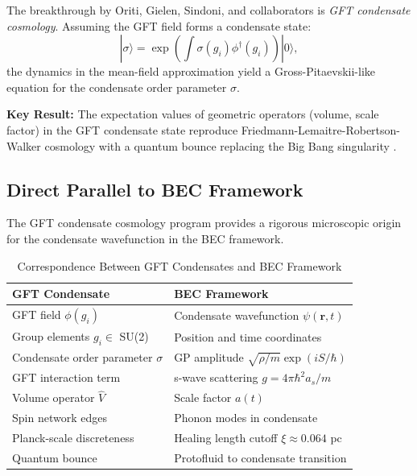 \documentclass[11pt,a4paper]{article}
\theoremstyle{definition}
\theoremstyle{remark}
\begin{document}
The breakthrough by Oriti, Gielen, Sindoni, and collaborators \cite{Gielen2013,Oriti2016,Gielen2016} is \emph{GFT condensate cosmology}. Assuming the GFT field forms a condensate state:
\begin{equation}
\label{eq:gft_condensate}
|\sigma\rangle = \exp\left(\int \sigma(g_i) \phi^\dagger(g_i)\right) |0\rangle,
\end{equation}
the dynamics in the mean-field approximation yield a Gross-Pitaevskii-like equation for the condensate order parameter $\sigma$.

\textbf{Key Result:} The expectation values of geometric operators (volume, scale factor) in the GFT condensate state reproduce Friedmann-Lemaitre-Robertson-Walker cosmology with a quantum bounce replacing the Big Bang singularity \cite{Oriti2016}.

\subsection{Direct Parallel to BEC Framework}
\label{sec:gft_bec_parallel}

The GFT condensate cosmology program provides a rigorous microscopic origin for the condensate wavefunction in the BEC framework.

\begin{table}[H]
\centering
\caption{Correspondence Between GFT Condensates and BEC Framework}
\label{tab:gft_bec}
\begin{tabular}{@{}ll@{}}
\toprule
\textbf{GFT Condensate} & \textbf{BEC Framework} \\
\midrule
GFT field $\phi(g_i)$ & Condensate wavefunction $\psi(\mathbf{r},t)$ \\
Group elements $g_i \in$ SU(2) & Position and time coordinates \\
Condensate order parameter $\sigma$ & GP amplitude $\sqrt{\rho/m}\exp(iS/\hbar)$ \\
GFT interaction term & s-wave scattering $g = 4\pi\hbar^2 a_s/m$ \\
Volume operator $\hat{V}$ & Scale factor $a(t)$ \\
Spin network edges & Phonon modes in condensate \\
Planck-scale discreteness & Healing length cutoff $\xi \approx 0.064$ pc \\
Quantum bounce & Protofluid to condensate transition \\
\bottomrule
\end{tabular}
\end{table}
\end{document}
